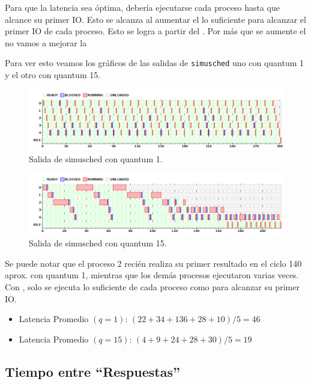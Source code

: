 Para que la latencia sea \'optima, deber\'ia ejecutarse cada proceso hasta que alcance su primer IO. Esto se alcanza al aumentar el \quantum lo suficiente para alcanzar el primer IO de cada proceso. Esto se logra a partir del . Por m\'as que se aumente el \quantum no vamos a mejorar la \latencia


Para ver esto veamos los gr\'aficos de las salidas de \verb|simusched| uno con quantum 1 y el otro con quantum 15.

\begin{figure}[H]
  \centering
    \includegraphics[width=1\textwidth]{img/SchedRRTest1.png}
    \caption{Salida de simusched con quantum 1.}
\end{figure}

\begin{figure}[H]
  \centering
    \includegraphics[width=1\textwidth]{img/SchedRRTest15.png}
    \caption{Salida de simusched con quantum 15.}
\end{figure}

Se puede notar que el proceso 2 reci\'en realiza su primer resultado en el ciclo 140 aprox. con quantum 1, mientras que los dem\'as procesos ejecutaron varias veces.\\
Con , solo se ejecuta lo suficiente de cada proceso como para alcanzar su primer IO.

\begin{itemize}
 \item Latencia Promedio $(q=1)$: $(22+34+136+28+10)/5 = 46$
 \item Latencia Promedio $(q=15)$: $(4 + 9 + 24 + 28 + 30) / 5 = 19$
\end{itemize}

\subsection{Tiempo entre ``Respuestas'' }


